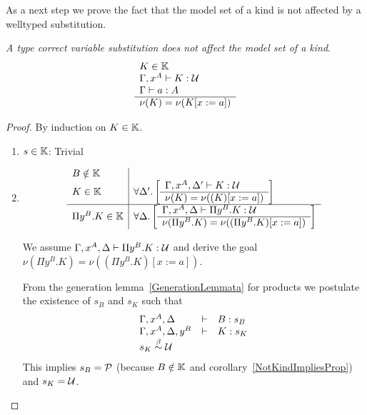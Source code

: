 As a next step we prove the fact that the model set of a kind is not affected by
a welltyped substitution.


\begin{theorem}
    \label{ModelSubstitutionSame}
    \emph{A type correct variable substitution does not affect the model set of
    a kind}.
    $$
    \begin{array}{l} 
        K \in \mathbb{K}
        \\
        \Gamma,x^A \vdash K: {\cal U}
        \\
        \Gamma \vdash a : A
     \\ \hline 
        \nu(K) = \nu(K[x:=a])
    \end{array}
    $$
    \begin{proof}

        By induction on $K \in \mathbb{K}$.

        \def\goal#1#2{
            \forall #1.
            \left[
                \rulev{
                    \Gamma,x^A,#1 \vdash #2: \Any
                }
                {
                    \nu(#2) = \nu((#2)[x:=a])
                }
            \right]
        }

        \begin{enumerate}
        \item $s \in \mathbb{K}$: Trivial

        \item
            $$
            \begin{array}{l|l}
                B \notin \Kinds
                \\
                K \in \Kinds
                &
                \goal {\Delta'} K
                \\
                \hline
                \Pi y^B. K \in \Kinds
                &
                \goal \Delta {\Pi y^B. K}
            \end{array}
            $$

            We assume $\Gamma,x^A,\Delta \vdash \Pi y^B.K : {\cal U}$ and derive the
            goal $\nu(\Pi y^B. K) = \nu((\Pi y^B.K)[x:=a])$.

            From the generation lemma~\ref{GenerationLemmata} for products we
            postulate the existence of $s_B$ and $s_K$ such that
            $$
            \begin{array}{lll}
                \Gamma,x^A,\Delta &\vdash& B: s_B
                \\
                \Gamma,x^A,\Delta,y^B &\vdash& K : s_K
                \\
                s_K \stackrel{\beta}{\sim} {\cal U}
            \end{array}
            $$
            This implies $s_B = {\cal P}$ (because $B\notin \mathbb{K}$ and
            corollary~\ref{NotKindImpliesProp}) and $s_K = {\cal U}$.


\end{enumerate}
\end{proof}
\end{theorem}
